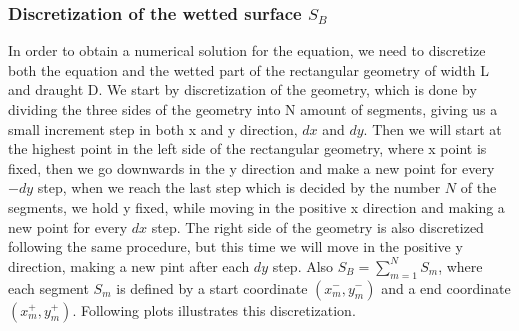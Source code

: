 \documentclass[a4paper,10pt]{article}
\begin{document}
\subsubsection{Discretization of the wetted surface $S_B$}
In order to obtain a numerical solution for the equation, we need to discretize both the equation and the wetted part of the rectangular geometry of width L and draught D. We start by discretization of the geometry, which is done by dividing the three sides of the geometry into N amount of segments, giving us a small increment step in both x and y direction, $dx$ and $dy$. Then we will start at the highest point in the left side of the rectangular geometry, where x point is fixed, then we go downwards in the y direction and make a new point for every $-dy$ step, when we reach the last step which is decided by the number $N$ of the segments, we hold y fixed, while moving in the positive x direction and making a new point for every $dx$ step. The right side of the geometry is also discretized following the same procedure, but this time we will move in the positive y direction, making a new pint after each $dy$ step. Also $S_B = \sum_{m=1}^N S_m$, where each segment $S_m$ is defined by a start coordinate $(x_m^-, y_m^-)$ and a end coordinate $(x_m^+, y_m^+)$. Following plots illustrates this discretization.
\end{document}
